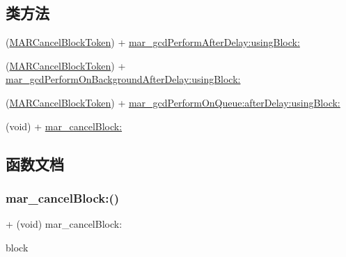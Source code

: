 \subsection*{类方法}
\begin{DoxyCompactItemize}
\item 
(\hyperlink{_n_s_object_09_m_a_r_e_x_8h_aefb8384298417c24573cc88fde04d1a7}{M\+A\+R\+Cancel\+Block\+Token}) + \hyperlink{category_n_s_object_07_m_a_r_e_x___g_c_d_08_a847e137022a4eea2f373f76bee22e279}{mar\+\_\+gcd\+Perform\+After\+Delay\+:using\+Block\+:}
\item 
(\hyperlink{_n_s_object_09_m_a_r_e_x_8h_aefb8384298417c24573cc88fde04d1a7}{M\+A\+R\+Cancel\+Block\+Token}) + \hyperlink{category_n_s_object_07_m_a_r_e_x___g_c_d_08_a59ea947cd1e11fdeef580bf36b288dce}{mar\+\_\+gcd\+Perform\+On\+Background\+After\+Delay\+:using\+Block\+:}
\item 
(\hyperlink{_n_s_object_09_m_a_r_e_x_8h_aefb8384298417c24573cc88fde04d1a7}{M\+A\+R\+Cancel\+Block\+Token}) + \hyperlink{category_n_s_object_07_m_a_r_e_x___g_c_d_08_aad5a471116b9a740dc84ea0bed077f78}{mar\+\_\+gcd\+Perform\+On\+Queue\+:after\+Delay\+:using\+Block\+:}
\item 
(void) + \hyperlink{category_n_s_object_07_m_a_r_e_x___g_c_d_08_a1aac7f00f5bc0488be6a85b4daaebd33}{mar\+\_\+cancel\+Block\+:}
\end{DoxyCompactItemize}


\subsection{函数文档}
\mbox{\label{category_n_s_object_07_m_a_r_e_x___g_c_d_08_a1aac7f00f5bc0488be6a85b4daaebd33}} 
\subsubsection{\texorpdfstring{mar\+\_\+cancel\+Block\+:()}{mar\_cancelBlock:()}}
{\footnotesize\ttfamily + (void) mar\+\_\+cancel\+Block\+: \begin{DoxyParamCaption}\item[{(\hyperlink{_n_s_object_09_m_a_r_e_x_8h_aefb8384298417c24573cc88fde04d1a7}{M\+A\+R\+Cancel\+Block\+Token})}]{block }\end{DoxyParamCaption}}

